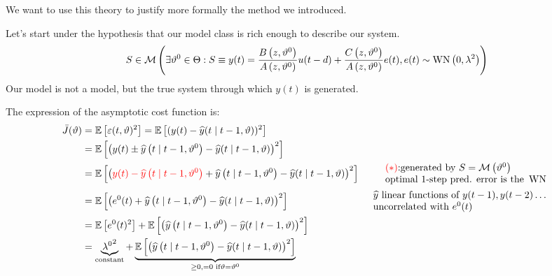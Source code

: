 We want to use this theory to justify more formally the method we introduced.

Let's start under the hypothesis that our model class is rich enough to describe our system.
\begin{equation*}
S\in \mathcal{M} \left(\exists \vartheta ^{0} \in \Theta :S\equiv y(t) =\frac{B\left(z,\vartheta ^{0}\right)}{A\left(z,\vartheta ^{0}\right)} u(t-d) +\frac{C\left(z,\vartheta ^{0}\right)}{A\left(z,\vartheta ^{0}\right)} e(t) ,e(t) \sim \operatorname{WN} \left(0,\lambda ^{2}\right)\right)
\end{equation*}
Our model is not a model, but the true system through which $ y(t)$ is generated.

The expression of the asymptotic cost function is:
\begin{equation*}
\begin{aligned}
\bar{J}(\theta) & =\E\left[ \varepsilon (t,\theta)^{2}\right] =\E\left[(y(t) -\hat{y}(t\mid t-1,\theta))^{2}\right] & \\
 & =\E\left[\left(y(t) \pm \hat{y}\left(t\mid t-1,\theta ^{0}\right) -\hat{y}(t\mid t-1,\theta)\right)^{2}\right] & \\
 & =\E\left[\left(\textcolor[rgb]{1,0,0}{y(t) -\hat{y}\left(t\mid t-1,\theta^{0}\right)} +\hat{y}\left(t\mid t-1,\theta ^{0}\right) -\hat{y}(t\mid t-1,\theta)\right)^{2}\right] &  \begin{array}{l}
\textcolor[rgb]{1,0,0}{(*)}\text{:generated by } S=\Mc\left(\theta ^{0}\right)\\
\text{optimal 1-step pred. error is the } \WN
\end{array}\\
 & =\E\left[\left(e^{0}(t) +\hat{y}\left(t\mid t-1,\theta ^{0}\right) -\hat{y}(t\mid t-1,\theta)\right)^{2}\right] &  \begin{array}{l}
\hat{y} \text{ linear functions of } y(t-1),y(t-2) \ldots\\
\text{uncorrelated with } e^{0}(t)
\end{array}\\
 & =\E\left[ e^{0}(t)^{2}\right] +\E\left[\left(\hat{y}\left(t\mid t-1,\theta ^{0}\right) -\hat{y}(t\mid t-1,\theta)\right)^{2}\right] & \\
 & =\underbrace{\lambda {^{0}}^{2}}_{\text{constant}} +\underbrace{\E\left[\left(\hat{y}\left(t\mid t-1,\theta ^{0}\right) -\hat{y}(t\mid t-1,\theta)\right)^{2}\right]}_{\geq 0,=0\text{ if} \theta =\theta ^{0}} & 
\end{aligned}
\end{equation*}

